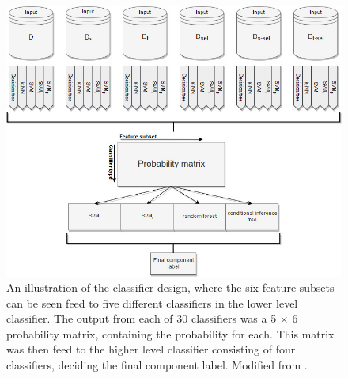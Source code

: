 \begin{figure}[H]                 
	\includegraphics[width=.95\textwidth]{figures/bMethods/classifier}  
	\caption{An illustration of the classifier design, where the six feature subsets can be seen feed to five different classifiers in the lower level classifier. The output from each of 30 classifiers was a 5 $\times$ 6 probability matrix, containing the probability for each. This matrix was then feed to the higher level classifier consisting of four classifiers, deciding the final component label. Modified from \cite{Salimi-Khorshidi2014}.}
	\label{fig:classifier} 
\end{figure}

